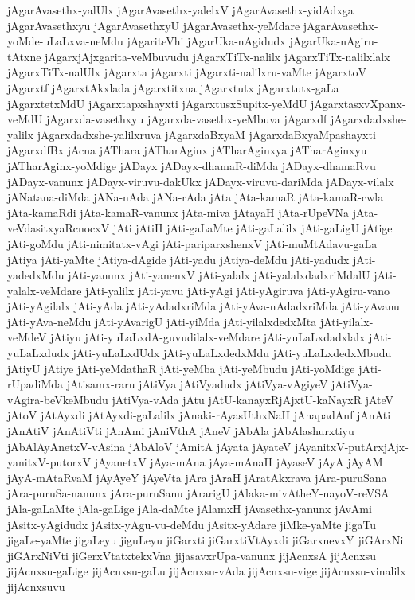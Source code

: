 {jAgarAvasethx-yalUlx
jAgarAvasethx-yalelxV
jAgarAvasethx-yidAdxga
jAgarAvasethxyu
jAgarAvasethxyU
jAgarAvasethx-yeMdare
jAgarAvasethx-yoMde-uLaLxva-neMdu
jAgariteVhi
jAgarUka-nAgidudx
jAgarUka-nAgiru-tAtxne
jAgarxjAjxgarita-veMbuvudu
jAgarxTiTx-nalilx
jAgarxTiTx-nalilxlalx
jAgarxTiTx-nalUlx
jAgarxta
jAgarxti
jAgarxti-nalilxru-vaMte
jAgarxtoV
jAgarxtf
jAgarxtAkxlada
jAgarxtitxna
jAgarxtutx
jAgarxtutx-gaLa
jAgarxtetxMdU
jAgarxtapxshayxti
jAgarxtusxSupitx-yeMdU
jAgarxtasxvXpanx-veMdU
jAgarxda-vasethxyu
jAgarxda-vasethx-yeMbuva
jAgarxdf
jAgarxdadxshe-yalilx
jAgarxdadxshe-yalilxruva
jAgarxdaBxyaM
jAgarxdaBxyaMpashayxti
jAgarxdfBx
jAcna
jAThara
jATharAginx
jATharAginxya
jATharAginxyu
jATharAginx-yoMdige
jADayx
jADayx-dhamaR-diMda
jADayx-dhamaRvu
jADayx-vanunx
jADayx-viruvu-dakUkx
jADayx-viruvu-dariMda
jADayx-vilalx
jANatana-diMda
jANa-nAda
jANa-rAda
jAta
jAta-kamaR
jAta-kamaR-cwla
jAta-kamaRdi
jAta-kamaR-vanunx
jAta-miva
jAtayaH
jAta-rUpeVNa
jAta-veVdasitxyaRcnocxV
jAti
jAtiH
jAti-gaLaMte
jAti-gaLalilx
jAti-gaLigU
jAtige
jAti-goMdu
jAti-nimitatx-vAgi
jAti-pariparxshenxV
jAti-muMtAdavu-gaLa
jAtiya
jAti-yaMte
jAtiya-dAgide
jAti-yadu
jAtiya-deMdu
jAti-yadudx
jAti-yadedxMdu
jAti-yanunx
jAti-yanenxV
jAti-yalalx
jAti-yalalxdadxriMdalU
jAti-yalalx-veMdare
jAti-yalilx
jAti-yavu
jAti-yAgi
jAti-yAgiruva
jAti-yAgiru-vano
jAti-yAgilalx
jAti-yAda
jAti-yAdadxriMda
jAti-yAva-nAdadxriMda
jAti-yAvanu
jAti-yAva-neMdu
jAti-yAvarigU
jAti-yiMda
jAti-yilalxdedxMta
jAti-yilalx-veMdeV
jAtiyu
jAti-yuLaLxdA-guvudilalx-veMdare
jAti-yuLaLxdadxlalx
jAti-yuLaLxdudx
jAti-yuLaLxdUdx
jAti-yuLaLxdedxMdu
jAti-yuLaLxdedxMbudu
jAtiyU
jAtiye
jAti-yeMdathaR
jAti-yeMba
jAti-yeMbudu
jAti-yoMdige
jAti-rUpadiMda
jAtisamx-raru
jAtiVya
jAtiVyadudx
jAtiVya-vAgiyeV
jAtiVya-vAgira-beVkeMbudu
jAtiVya-vAda
jAtu
jAtU-kanayxRjAjxtU-kaNayxR
jAteV
jAtoV
jAtAyxdi
jAtAyxdi-gaLalilx
jAnaki-rAyasUthxNaH
jAnapadAnf
jAnAti
jAnAtiV
jAnAtiVti
jAnAmi
jAniVthA
jAneV
jAbAla
jAbAlashurxtiyu
jAbAlAyAnetxV-vAsina
jAbAloV
jAmitA
jAyata
jAyateV
jAyanitxV-putArxjAjx-yanitxV-putorxV
jAyanetxV
jAya-mAna
jAya-mAnaH
jAyaseV
jAyA
jAyAM
jAyA-mAtaRvaM
jAyAyeY
jAyeVta
jAra
jAraH
jAratAkxrava
jAra-puruSana
jAra-puruSa-nanunx
jAra-puruSanu
jArarigU
jAlaka-mivAtheY-nayoV-reVSA
jAla-gaLaMte
jAla-gaLige
jAla-daMte
jAlamxH
jAvasethx-yanunx
jAvAmi
jAsitx-yAgidudx
jAsitx-yAgu-vu-deMdu
jAsitx-yAdare
jiMke-yaMte
jigaTu
jigaLe-yaMte
jigaLeyu
jiguLeyu
jiGarxti
jiGarxtiVtAyxdi
jiGarxnevxY
jiGArxNi
jiGArxNiVti
jiGerxVtatxtekxVna
jijasavxrUpa-vanunx
jijAcnxsA
jijAcnxsu
jijAcnxsu-gaLige
jijAcnxsu-gaLu
jijAcnxsu-vAda
jijAcnxsu-vige
jijAcnxsu-vinalilx
jijAcnxsuvu
}
